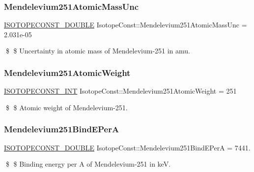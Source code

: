 \subsubsection{\texorpdfstring{Mendelevium251\+Atomic\+Mass\+Unc}{Mendelevium251AtomicMassUnc}}
{\footnotesize\ttfamily \mbox{\hyperlink{group___isotope_const-_macros_ga8f45a7272ce02c0b4c65c44636ed719a}{I\+S\+O\+T\+O\+P\+E\+C\+O\+N\+S\+T\+\_\+\+D\+O\+U\+B\+LE}} Isotope\+Const\+::\+Mendelevium251\+Atomic\+Mass\+Unc = 2.\+031e-\/05}

\$ \$ Uncertainty in atomic mass of Mendelevium-\/251 in amu. \mbox{\label{group___isotope_const-_mendelevium-_md251_gab57430b550eeaebd6151af5244cf48f7}} 
\subsubsection{\texorpdfstring{Mendelevium251\+Atomic\+Weight}{Mendelevium251AtomicWeight}}
{\footnotesize\ttfamily \mbox{\hyperlink{group___isotope_const-_macros_ga5f18360b3e99483a35c32d789e62621c}{I\+S\+O\+T\+O\+P\+E\+C\+O\+N\+S\+T\+\_\+\+I\+NT}} Isotope\+Const\+::\+Mendelevium251\+Atomic\+Weight = 251}

\$ \$ Atomic weight of Mendelevium-\/251. \mbox{\label{group___isotope_const-_mendelevium-_md251_gadd42238d7b862fb74c19a1f76b41bca3}} 
\subsubsection{\texorpdfstring{Mendelevium251\+Bind\+E\+PerA}{Mendelevium251BindEPerA}}
{\footnotesize\ttfamily \mbox{\hyperlink{group___isotope_const-_macros_ga8f45a7272ce02c0b4c65c44636ed719a}{I\+S\+O\+T\+O\+P\+E\+C\+O\+N\+S\+T\+\_\+\+D\+O\+U\+B\+LE}} Isotope\+Const\+::\+Mendelevium251\+Bind\+E\+PerA = 7441.}

\$ \$ Binding energy per A of Mendelevium-\/251 in keV. \mbox{\label{group___isotope_const-_mendelevium-_md251_ga653bd7092f12763e25730c8b7e0113b8}} 

